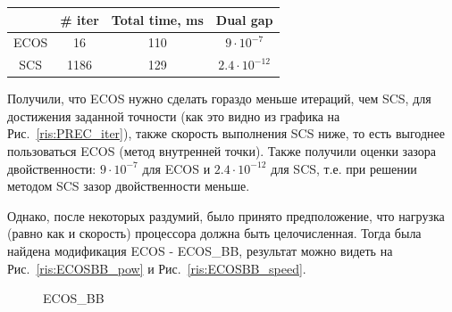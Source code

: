 \documentclass{article}
\begin{document}
\begin{center}
\begin{tabular}{c|c|c|c}
     &  \# iter & Total time, ms & Dual gap \\
     \hline
     ECOS & 16 &110 & $9\cdot{10^{-7}}$ \\
     \hline
     SCS & 1186 & 129& $2.4\cdot{10^{-12}}$ \\
\end{tabular}
\end{center}

Получили, что ECOS нужно сделать гораздо меньше итераций, чем SCS, для достижения заданной точности (как это видно из графика на Рис.~\ref{ris:PREC_iter}), также скорость выполнения SCS ниже, то есть выгоднее пользоваться ECOS (метод внутренней точки). Также получили оценки зазора двойственности: $9\cdot{10^{-7}}$ для ECOS и $2.4\cdot{10^{-12}}$ для SCS, т.е. при решении методом SCS зазор двойственности меньше. 

Однако, после некоторых раздумий, было принято предположение, что нагрузка (равно как и скорость) процессора должна быть целочисленная. Тогда была найдена модификация ECOS - ECOS\_BB, результат можно видеть на Рис.~\ref{ris:ECOSBB_pow} и Рис.~\ref{ris:ECOSBB_speed}.

\begin{figure}[h]
\caption{ECOS\_BB}
\end{figure}
\end{document}
